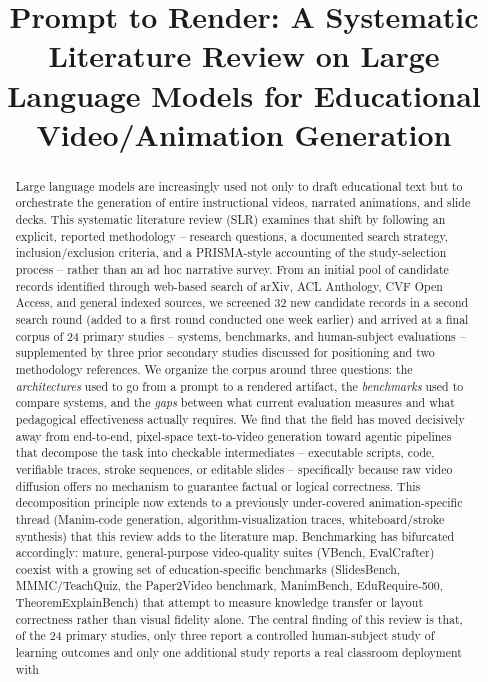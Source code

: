 \documentclass[journal]{IEEEtran}
\begin{document}
\title{Prompt to Render: A Systematic Literature Review on Large Language Models for Educational Video/Animation Generation}

\author{
}

\maketitle

\begin{abstract}
Large language models are increasingly used not only to draft educational text but to orchestrate the generation of entire instructional videos, narrated animations, and slide decks. This systematic literature review (SLR) examines that shift by following an explicit, reported methodology -- research questions, a documented search strategy, inclusion/exclusion criteria, and a PRISMA-style accounting of the study-selection process -- rather than an ad hoc narrative survey. From an initial pool of candidate records identified through web-based search of arXiv, ACL Anthology, CVF Open Access, and general indexed sources, we screened 32 new candidate records in a second search round (added to a first round conducted one week earlier) and arrived at a final corpus of 24 primary studies -- systems, benchmarks, and human-subject evaluations -- supplemented by three prior secondary studies discussed for positioning and two methodology references. We organize the corpus around three questions: the \emph{architectures} used to go from a prompt to a rendered artifact, the \emph{benchmarks} used to compare systems, and the \emph{gaps} between what current evaluation measures and what pedagogical effectiveness actually requires. We find that the field has moved decisively away from end-to-end, pixel-space text-to-video generation toward agentic pipelines that decompose the task into checkable intermediates -- executable scripts, code, verifiable traces, stroke sequences, or editable slides -- specifically because raw video diffusion offers no mechanism to guarantee factual or logical correctness. This decomposition principle now extends to a previously under-covered animation-specific thread (Manim-code generation, algorithm-visualization traces, whiteboard/stroke synthesis) that this review adds to the literature map. Benchmarking has bifurcated accordingly: mature, general-purpose video-quality suites (VBench, EvalCrafter) coexist with a growing set of education-specific benchmarks (SlidesBench, MMMC/TeachQuiz, the Paper2Video benchmark, ManimBench, EduRequire-500, TheoremExplainBench) that attempt to measure knowledge transfer or layout correctness rather than visual fidelity alone. The central finding of this review is that, of the 24 primary studies, only three report a controlled human-subject study of learning outcomes and only one additional study reports a real classroom deployment with 
\end{abstract}
\end{document}
